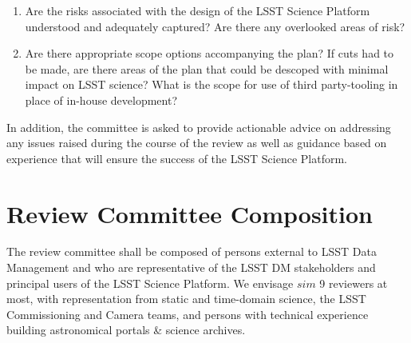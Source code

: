 \documentclass[DM,toc]{lsstdoc}
\begin{document}
\begin{enumerate}
\item Are the risks associated with the design of the LSST Science Platform understood and adequately captured? Are there any overlooked areas of risk?
%
\item Are there appropriate scope options accompanying the plan? 
If cuts had to be made, are there areas of the plan that could be descoped with minimal impact on LSST science?
What is the scope for use of third party-tooling in place of in-house development? 

\end{enumerate}

In addition, the committee is asked to provide actionable advice on addressing any issues raised during the course of the review as well as guidance based on experience that will ensure the success of the LSST Science Platform.

\section{Review Committee Composition}
The review committee shall be composed of persons external to LSST Data Management
and who are representative of the LSST DM stakeholders and principal users of the LSST Science Platform. 
We envisage $sim$ 9 reviewers at most, with representation from static and time-domain science, the LSST Commissioning and Camera teams,  
and persons with technical experience building astronomical portals \& science archives. 

\end{document}
